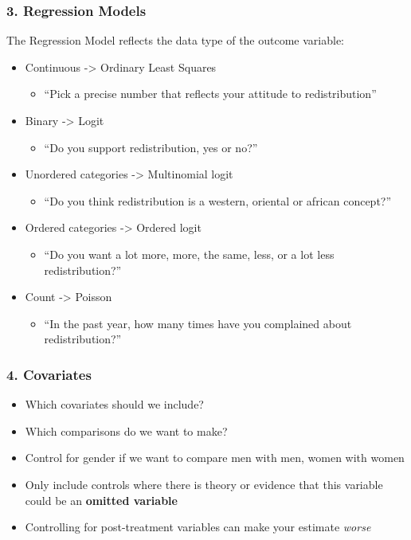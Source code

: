 \documentclass[xcolor=x11names,compress]{beamer}\usepackage[]{graphicx}\usepackage[]{color}
\renewcommand{\(}{\begin{columns}}
\renewcommand{\)}{\end{columns}}
\newcommand{\<}[1]{\begin{column}{#1}}
\renewcommand{\>}{\end{column}}
\begin{document}
\begin{frame}
\frametitle{3. Regression Models}
The Regression Model reflects the data type of the outcome variable:
\begin{itemize}
\item Continuous -> Ordinary Least Squares  
\begin{itemize}
\item ``Pick a precise number that reflects your attitude to redistribution''
\end{itemize}
\pause
\item Binary -> Logit  
\begin{itemize}
\item ``Do you support redistribution, yes or no?''
\end{itemize}
\pause
\item Unordered categories -> Multinomial logit  
\begin{itemize}
\item ``Do you think redistribution is a western, oriental or african concept?''
\end{itemize}
\pause
\item Ordered categories -> Ordered logit  
\begin{itemize}
\item ``Do you want a lot more, more, the same, less, or a lot less redistribution?''
\end{itemize}
\pause
\item Count -> Poisson  
\begin{itemize}
\item ``In the past year, how many times have you complained about redistribution?''
\end{itemize}
\end{itemize}
\end{frame}

\begin{frame}
\frametitle{4. Covariates}
\begin{itemize}
\item Which covariates should we include?
\pause
\item Which comparisons do we want to make?
\pause
\item Control for gender if we want to compare men with men, women with women
\pause
\item Only include controls where there is theory or evidence that this variable could be an \textbf{omitted variable}
\pause
\item Controlling for post-treatment variables can make your estimate \textit{worse}
\end{itemize}
\end{frame}
\end{document}
